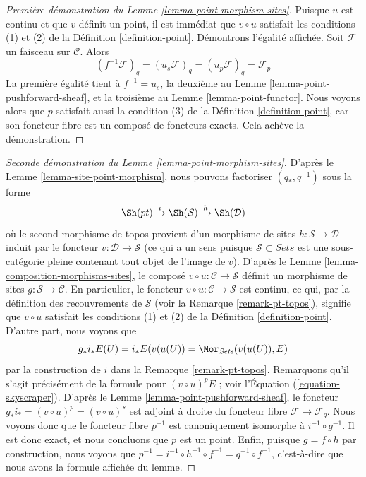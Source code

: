 \begin{proof}[Première démonstration du Lemme \ref{lemma-point-morphism-sites}]
Puisque $u$ est continu et que $v$ définit un point,
il est immédiat que $v \circ u$ satisfait les conditions (1) et (2) de la
Définition \ref{definition-point}. Démontrons l’égalité affichée.
Soit $\mathcal{F}$ un faisceau sur $\mathcal{C}$. Alors
$$
(f^{-1}\mathcal{F})_q = (u_s\mathcal{F})_q =
(u_p \mathcal{F})_q = \mathcal{F}_p
$$
La première égalité tient à $f^{-1} = u_s$, la deuxième au
Lemme \ref{lemma-point-pushforward-sheaf}, et la troisième
au Lemme \ref{lemma-point-functor}.
Nous voyons alors que $p$ satisfait aussi la condition (3) de la
Définition \ref{definition-point},
car son foncteur fibre est un composé de foncteurs exacts. Cela achève la démonstration.
\end{proof}

\begin{proof}[Seconde démonstration du Lemme \ref{lemma-point-morphism-sites}]
D’après le
Lemme \ref{lemma-site-point-morphism},
nous pouvons factoriser $(q_*, q^{-1})$ sous la forme
$$
\Sh(pt) \xrightarrow{i} \Sh(\mathcal{S})
\xrightarrow{h} \Sh(\mathcal{D})
$$
où le second morphisme de topos provient d’un morphisme de sites
$h : \mathcal{S} \to \mathcal{D}$ induit par le foncteur
$v : \mathcal{D} \to \mathcal{S}$ (ce qui a un sens puisque
$\mathcal{S} \subset \textit{Sets}$ est une sous-catégorie pleine contenant
tout objet de l’image de $v$). D’après le
Lemme \ref{lemma-composition-morphisms-sites},
le composé $v \circ u : \mathcal{C} \to \mathcal{S}$
définit un morphisme de sites $g : \mathcal{S} \to \mathcal{C}$.
En particulier, le foncteur
$v \circ u : \mathcal{C} \to \mathcal{S}$
est continu, ce qui, par la définition des recouvrements
de $\mathcal{S}$ (voir la
Remarque \ref{remark-pt-topos}),
signifie que $v \circ u$ satisfait les conditions (1) et (2) de la
Définition \ref{definition-point}.
D’autre part, nous voyons que
$$
g_*i_*E(U) = i_*E(v(u(U)) = \Mor_{\textit{Sets}}(v(u(U)), E)
$$
par la construction de $i$ dans la
Remarque \ref{remark-pt-topos}.
Remarquons qu’il s’agit précisément de la formule pour
$(v \circ u)^pE$ ; voir l’Équation (\ref{equation-skyscraper}).
D’après le
Lemme \ref{lemma-point-pushforward-sheaf},
le foncteur $g_*i_* = (v \circ u)^p = (v \circ u)^s$
est adjoint à droite du foncteur fibre
$\mathcal{F} \mapsto \mathcal{F}_q$.
Nous voyons donc que le foncteur fibre $p^{-1}$ est canoniquement
isomorphe à $i^{-1} \circ g^{-1}$. Il est donc exact, et
nous concluons que $p$ est un point. Enfin, puisque
$g = f \circ h$ par construction, nous voyons que
$p^{-1} = i^{-1} \circ h^{-1} \circ f^{-1} = q^{-1} \circ f^{-1}$,
c’est-à-dire que nous avons la formule affichée du lemme.
\end{proof}

